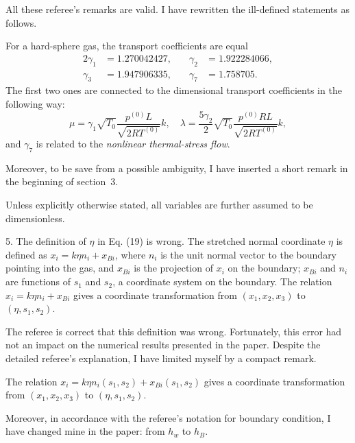 \documentclass{article}
\begin{document}
All these referee's remarks are valid. I have rewritten the ill-defined statements as follows.
\begin{leftbar}
For a hard-sphere gas, the transport coefficients are equal
\begin{alignat*}{2}
    \gamma_1 &= 1.270042427, &\quad \gamma_2 &= 1.922284066, \\
    \gamma_3 &= 1.947906335, &\quad \gamma_7 &= 1.758705.
\end{alignat*}
The first two ones are connected to the dimensional transport coefficients in the following way:
\begin{equation}
    \mu = \gamma_1\sqrt{T_0} \frac{p^{(0)}L}{\sqrt{2RT^{(0)}}} k, \quad
    \lambda = \frac{5\gamma_2}{2}\sqrt{T_0} \frac{p^{(0)}RL}{\sqrt{2RT^{(0)}}} k,
\end{equation}
and \(\gamma_7\) is related to the \emph{nonlinear thermal-stress flow}.
\end{leftbar}
Moreover, to be save from a possible ambiguity,
I have inserted a short remark in the beginning of section~3.
\begin{leftbar}
Unless explicitly otherwise stated, all variables are further assumed to be dimensionless.
\end{leftbar}

\begin{quoting}
5. The definition of \(\eta\) in Eq. (19) is wrong. The stretched normal
coordinate \(\eta\) is defined as \(x_i = k\eta n_i + x_{Bi}\), where \(n_i\) is the unit normal
vector to the boundary pointing into the gas, and \(x_{Bi}\) is the projection
of \(x_i\) on the boundary; \(x_{Bi}\) and \(n_i\) are functions of \(s_1\) and \(s_2\), a
coordinate system on the boundary. The relation \(x_i = k\eta n_i + x_{Bi}\) gives a
coordinate transformation from \((x_1, x_2, x_3)\) to \((\eta, s_1, s_2)\).
\end{quoting}

The referee is correct that this definition was wrong.
Fortunately, this error had not an impact on the numerical results presented in the paper.
Despite the detailed referee's explanation, I have limited myself by a compact remark.
\begin{leftbar}
The relation \( x_i = k\eta n_i(s_1,s_2) + x_{Bi}(s_1, s_2) \) gives a coordinate transformation
from \((x_1,x_2,x_3)\) to \((\eta,s_1,s_2)\).
\end{leftbar}
Moreover, in accordance with the referee's notation for boundary condition,
I have changed mine in the paper: from \(h_w\) to \(h_B\).
\end{document}
